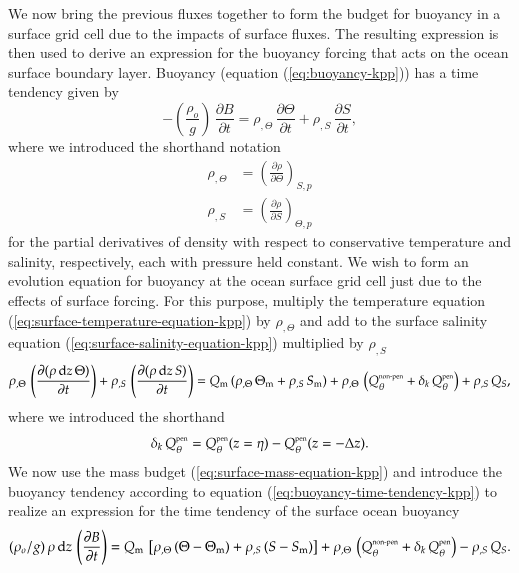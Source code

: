 We now bring the previous fluxes together to form the budget for
buoyancy in a surface grid cell due to the impacts of surface fluxes.
The resulting expression is then used to derive an expression for the
buoyancy forcing that acts on the ocean surface boundary layer.
Buoyancy (equation (\ref{eq:buoyancy-kpp})) has a time tendency given
by
\begin{equation}
 -\left( \frac{\rho_{o}}{g} \right) \,  \frac{\partial B}{\partial t} 
  =  \rho_{,\Theta} \, \frac{\partial \Theta}{\partial t}  + \rho_{,S} \, \frac{\partial S}{\partial t},
\label{eq:buoyancy-time-tendency-kpp}
\end{equation}
 where we introduced the shorthand notation 
\begin{align}
\rho_{,\Theta} &=
 \left( \frac{\partial \rho}{\partial \Theta} \right)_{S,p} 
\\
\rho_{,S} &=
 \left( \frac{\partial \rho}{\partial S} \right)_{\Theta,p} 
\end{align}
for the partial derivatives of density with respect to conservative
temperature and salinity, respectively, each with pressure held
constant.  We wish to form an evolution equation for buoyancy at the
ocean surface grid cell just due to the effects of surface forcing.
For this purpose, multiply the temperature equation
(\ref{eq:surface-temperature-equation-kpp}) by $\rho_{,\Theta}$ and
add to the surface salinity equation
(\ref{eq:surface-salinity-equation-kpp}) multiplied by $\rho_{,S}$
\begin{equation}
  \rho_{,\Theta} \, \left( \frac{ \partial (\rho \, \mathrm{d}z \, \Theta)}{\partial t} \right)
  +
  \rho_{,S}      \, \left( \frac{\partial (\rho \, \mathrm{d}z \, S)}{\partial t} \right)
  =
  Q_{\mbox{\scriptsize m}} \, (\rho_{,\Theta} \, \Theta_{\mbox{\scriptsize m}} +  \rho_{,S}  \, S_{\mbox{\scriptsize m}}) 
  + \rho_{,\Theta} \, \left( 
     Q_{\theta}^{\mbox{\tiny non-pen}} + 
    \delta_{k} \, Q_{\theta}^{\mbox{\tiny pen}} \right)
    + \rho_{,S} \, Q_{S},
\end{equation}
 where we introduced the shorthand 
\begin{equation}
 \delta_{k} \, Q_{\theta}^{\mbox{\tiny pen}} = 
   Q_{\theta}^{\mbox{\tiny pen}}(z=\eta) - Q_{\theta}^{\mbox{\tiny pen}}(z=-\Delta z).
\label{eq:delta-k-defined}
\end{equation}
We now use the mass budget (\ref{eq:surface-mass-equation-kpp}) and
introduce the buoyancy tendency according to equation
(\ref{eq:buoyancy-time-tendency-kpp}) to realize an expression for the
time tendency of the surface ocean buoyancy
\begin{equation}
  (\rho_{o}/g) \, \rho \, \mathrm{d}z \, \left( \frac{\partial B}{\partial t} \right)
  =
  Q_{\mbox{\scriptsize m}} \, \left[  \rho_{,\Theta} \, (\Theta - \Theta_{\mbox{\scriptsize m}})  
                   + \rho_{,S} \, (S - S_{\mbox{\scriptsize m}}) \right]
+ \rho_{,\Theta} \, \left( Q_{\theta}^{\mbox{\tiny non-pen}} + \delta_{k} \, Q_{\theta}^{\mbox{\tiny pen}} \right)  - \rho_{,S} \, Q_{S}.
\end{equation}
